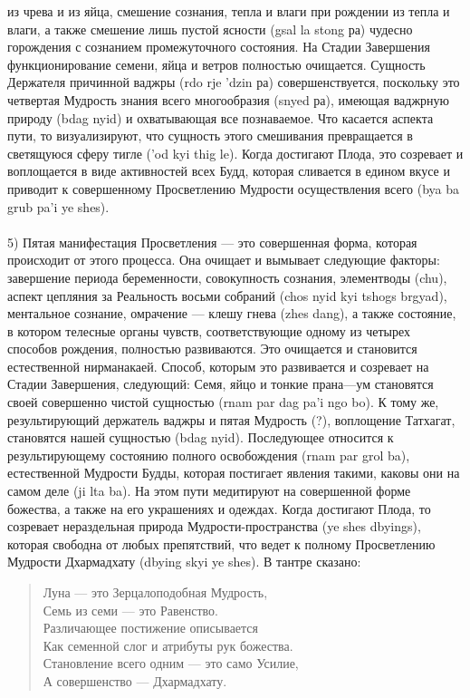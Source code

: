 из чрева и из яйца, смешение сознания, тепла и влаги при рождении из тепла и влаги, а также
смешение лишь пустой ясности (gsal la stong ра) чудесно горождения с сознанием
промежуточного состояния. На Стадии Завершения функционирование семени, яйца и
ветров полностью очищается. Сущность Держателя причинной ваджры (rdo rje 'dzin ра)
совершенствуется, поскольку это четвертая Мудрость знания всего многообразия (snyed
ра), имеющая ваджрную природу (bdag nyid) и охватывающая все познаваемое. Что касается
аспекта пути, то визуализируют, что сущность этого смешивания превращается в
светящуюся сферу тигле ('od kyi thig le). Когда достигают Плода, это созревает и
воплощается в виде активностей всех Будд, которая сливается в едином вкусе и приводит к
совершенному Просветлению Мудрости осуществления всего (bya ba grub pa'i ye shes).\\
\\
5) Пятая манифестация Просветления — это совершенная форма, которая
происходит от этого процесса. Она очищает и вымывает следующие факторы: завершение
периода беременности, совокупность сознания, элементводы (chu), аспект цепляния за
Реальность восьми собраний (chos nyid kyi tshogs brgyad), ментальное сознание, омрачение —
клешу гнева (zhes dang), а также состояние, в котором телесные органы чувств,
соответствующие одному из четырех способов рождения, полностью развиваются. Это
очищается и становится естественной нирманакаей. Способ, которым это развивается и
созревает на Стадии Завершения, следующий: Семя, яйцо и тонкие прана—ум становятся
своей совершенно чистой сущностью (rnam par dag pa'i ngo bo). К тому же, результирующий
держатель ваджры и пятая Мудрость (?), воплощение Татхагат, становятся нашей сущностью
(bdag nyid). Последующее относится к результирующему состоянию полного освобождения
(rnam par grol ba), естественной Мудрости Будды, которая постигает явления такими, каковы
они на самом деле (ji lta ba). На этом пути медитируют на совершенной форме божества, а
также на его украшениях и одеждах. Когда достигают Плода, то созревает нераздельная
природа Мудрости-пространства (ye shes dbyings), которая свободна от любых препятствий,
что ведет к полному Просветлению Мудрости Дхармадхату (dbying skyi ye shes). В тантре
сказано:

\begin{verse}
Луна — это Зерцалоподобная Мудрость,\\
Семь из семи — это Равенство.\\
Различающее постижение описывается\\
Как семенной слог и атрибуты рук божества.\\
Становление всего одним — это само Усилие,\\
А совершенство — Дхармадхату.
\end{verse}

